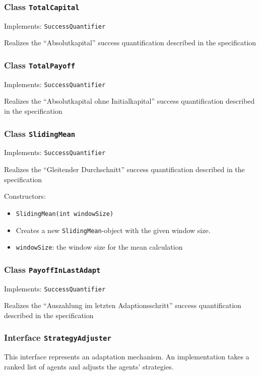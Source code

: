 \documentclass[parskip=full,11pt]{scrartcl}
\begin{document}
\subsubsection{Class \texttt{TotalCapital}}
Implements: \texttt{SuccessQuantifier}

Realizes the \enquote{Absolutkapital} success quantification described in the specification

\subsubsection{Class \texttt{TotalPayoff}}
Implements: \texttt{SuccessQuantifier}

Realizes the \enquote{Absolutkapital ohne Initialkapital} success quantification described in the specification

\subsubsection{Class \texttt{SlidingMean}}
Implements: \texttt{SuccessQuantifier}

Realizes the \enquote{Gleitender Durchschnitt} success quantification described in the specification

Constructors:
\begin{itemize}\itemsep -10pt
\item \texttt{SlidingMean(int windowSize)}
\item[] Creates a new \texttt{SlidingMean}-object with the given window size.
\item[] \texttt{windowSize}: the window size for the mean calculation
\end{itemize}

\subsubsection{Class \texttt{PayoffInLastAdapt}}
Implements: \texttt{SuccessQuantifier}

Realizes the \enquote{Auszahlung im letzten Adaptionsschritt} success quantification described in the specification

\subsubsection{Interface \texttt{StrategyAdjuster}}
This interface represents an adaptation mechanism. An implementation takes a ranked list of agents and adjusts the agents' strategies.
\end{document}
